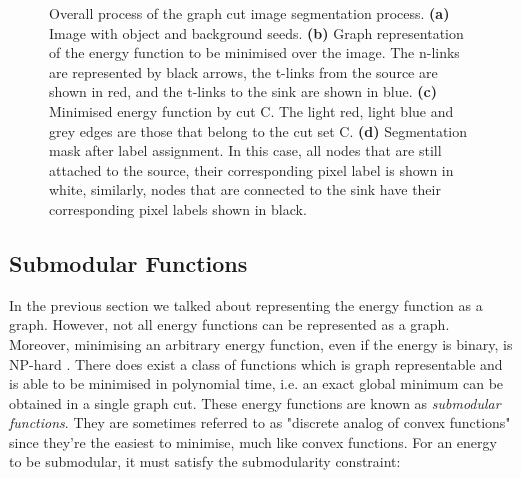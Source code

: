 \begin{figure}[!t]
	\centering
	\caption{Overall process of the graph cut image segmentation process.
	\textbf{(a)} Image with object and background seeds.
	\textbf{(b)} Graph representation of the energy function to be minimised over the image. The n-links are represented by black arrows, the t-links from the source are shown in red, and the t-links to the sink are shown in blue.
	\textbf{(c)} Minimised energy function by cut C. The light red, light blue and grey edges are those that belong to the cut set C.
	\textbf{(d)} Segmentation mask after label assignment. In this case, all nodes that are still attached to the source, their corresponding pixel label is shown in white, similarly, nodes that are connected to the sink have their corresponding pixel labels shown in black.}
	\label{fig:graphcut_process}
\end{figure}


\subsection{Submodular Functions}
\label{sec:SubmodularFunctions}

In the previous section we talked about representing the energy function as a graph. However, not all energy functions can be represented as a graph. Moreover, minimising an arbitrary energy function, even if the energy is binary, is NP-hard \citep{Shimony1994}. There does exist a class of functions which is graph representable and is able to be minimised in polynomial time, i.e. an exact global minimum can be obtained in a single graph cut. These energy functions are known as \textit{submodular functions}. They are sometimes referred to as "discrete analog of convex functions" since they're the easiest to minimise, much like convex functions. For an energy to be submodular, it must satisfy the submodularity constraint:

